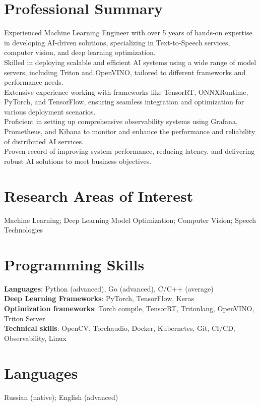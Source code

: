 \section{\sc Professional Summary}
Experienced Machine Learning Engineer with over 5 years of hands-on expertise in developing AI-driven solutions, specializing in Text-to-Speech services, computer vision, and deep learning optimization. \\
Skilled in deploying scalable and efficient AI systems using a wide range of model servers, including Triton and OpenVINO, tailored to different frameworks and performance needs. \\
Extensive experience working with frameworks like TensorRT, ONNXRuntime, PyTorch, and TensorFlow, ensuring seamless integration and optimization for various deployment scenarios. \\
Proficient in setting up comprehensive observability systems using Grafana, Prometheus, and Kibana to monitor and enhance the performance and reliability of distributed AI services. \\
Proven record of improving system performance, reducing latency, and delivering robust AI solutions to meet business objectives.

\section{\sc Research Areas of Interest}
{Machine Learning; Deep Learning Model Optimization; Computer Vision; Speech Technologies}

\section{\sc Programming Skills}
\textbf{Languages}: Python (advanced), Go (advanced), C/C++ (average) \\
\textbf{Deep Learning Frameworks}: PyTorch, TensorFlow, Keras \\
\textbf{Optimization frameworks}: Torch compile, TensorRT, Tritonlang, OpenVINO, Triton Server \\
\textbf{Technical skills}: OpenCV, Torchaudio, Docker, Kubernetes, Git, CI/CD, Observability, Linux

\section{\sc Languages}
{Russian (native); English (advanced)}

\endinput
